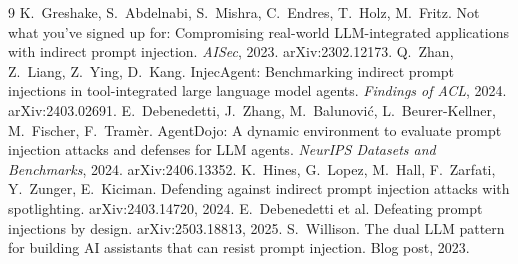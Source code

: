 \documentclass[10pt]{article}
\begin{document}
\begin{thebibliography}{9}\small
{} K.~Greshake, S.~Abdelnabi, S.~Mishra, C.~Endres, T.~Holz, M.~Fritz. Not what you've signed up for: Compromising real-world LLM-integrated applications with indirect prompt injection. \emph{AISec}, 2023. arXiv:2302.12173.
 Q.~Zhan, Z.~Liang, Z.~Ying, D.~Kang. InjecAgent: Benchmarking indirect prompt injections in tool-integrated large language model agents. \emph{Findings of ACL}, 2024. arXiv:2403.02691.
 E.~Debenedetti, J.~Zhang, M.~Balunovi\'c, L.~Beurer-Kellner, M.~Fischer, F.~Tram\`er. AgentDojo: A dynamic environment to evaluate prompt injection attacks and defenses for LLM agents. \emph{NeurIPS Datasets and Benchmarks}, 2024. arXiv:2406.13352.
 K.~Hines, G.~Lopez, M.~Hall, F.~Zarfati, Y.~Zunger, E.~Kiciman. Defending against indirect prompt injection attacks with spotlighting. arXiv:2403.14720, 2024.
 E.~Debenedetti et al. Defeating prompt injections by design. arXiv:2503.18813, 2025.
 S.~Willison. The dual LLM pattern for building AI assistants that can resist prompt injection. Blog post, 2023.
\end{thebibliography}
\end{document}
